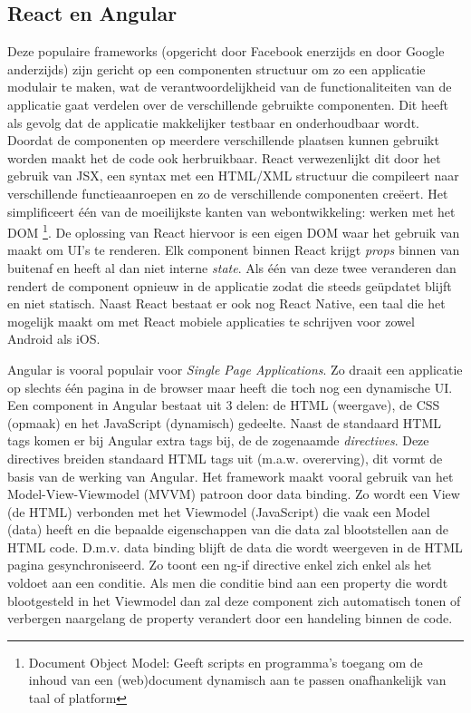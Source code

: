 \subsection{React en Angular}
Deze populaire frameworks (opgericht door Facebook enerzijds en door Google anderzijds) zijn gericht op een componenten structuur om zo een applicatie modulair te maken, wat de verantwoordelijkheid van de functionaliteiten van de applicatie gaat verdelen over de verschillende gebruikte componenten. Dit heeft als gevolg dat de applicatie makkelijker testbaar en onderhoudbaar wordt. Doordat de componenten op meerdere verschillende plaatsen kunnen gebruikt worden maakt het de code ook herbruikbaar. React verwezenlijkt dit door het gebruik van JSX, een syntax met een HTML/XML structuur die compileert naar verschillende functieaanroepen en zo de verschillende componenten creëert. Het simplificeert één van de moeilijkste kanten van webontwikkeling: werken met het DOM \footnote{Document Object Model: Geeft scripts en programma's toegang om de inhoud van een (web)document dynamisch aan te passen onafhankelijk van taal of platform}. De oplossing van React hiervoor is een eigen DOM waar het gebruik van maakt om UI's te renderen. Elk component binnen React krijgt \textit{props} binnen van buitenaf en heeft al dan niet interne \textit{state}. Als één van deze twee veranderen dan rendert de component opnieuw in de applicatie zodat die steeds geüpdatet blijft en niet statisch. Naast React bestaat er ook nog React Native, een taal die het mogelijk maakt om met React mobiele applicaties te schrijven voor zowel Android als iOS.

Angular is vooral populair voor \textit{Single Page Applications}. Zo draait een applicatie op slechts één pagina in de browser maar heeft die toch nog een dynamische UI. Een component in Angular bestaat uit 3 delen: de HTML (weergave), de CSS (opmaak) en het JavaScript (dynamisch) gedeelte. Naast de standaard HTML tags komen er bij Angular extra tags bij, de de zogenaamde \textit{directives}. Deze directives breiden standaard HTML tags uit (m.a.w. overerving), dit vormt de basis van de werking van Angular. Het framework maakt vooral gebruik van het Model-View-Viewmodel (MVVM) patroon door data binding. Zo wordt een View (de HTML) verbonden met het Viewmodel (JavaScript) die vaak een Model (data) heeft en die bepaalde eigenschappen van die data zal blootstellen aan de HTML code. D.m.v. data binding blijft de data die wordt weergeven in de HTML pagina gesynchroniseerd. Zo toont een ng-if directive enkel zich enkel als het voldoet aan een conditie. Als men die conditie bind aan een property die wordt blootgesteld in het Viewmodel dan zal deze component zich automatisch tonen of verbergen naargelang de property verandert door een handeling binnen de code.  

